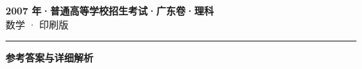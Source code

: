 \documentclass[zihao=5, a4paper]{ctexart}
\begin{document}
\begin{center}
  {\Large\bfseries 2007 年·普通高等学校招生考试·广东卷·理科}\\[4pt]
  {\large 数学 · 印刷版}
\end{center}
\medskip
{}

\par\bigskip\hrule\bigskip
{}
\begin{center}{\large\bfseries 参考答案与详细解析}\end{center}
\smallskip

\end{document}
